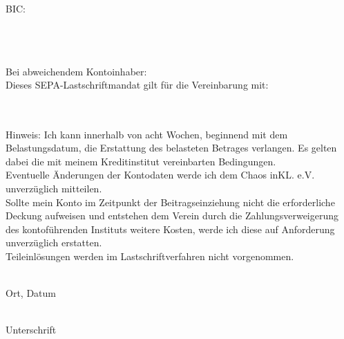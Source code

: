 \documentclass[ngerman,a4wide]{scrartcl}
\begin{document}
\begin{Form}
BIC:\\
\begin{tabular}{|p{}|}
\hline
\TextField[name=bic,width=.9\textwidth,%
bordercolor={0.65 0.79 0.94}]{}\\
\hline
\end{tabular}\\
\\
Bei abweichendem Kontoinhaber:\\
Dieses SEPA-Lastschriftmandat gilt für die Vereinbarung mit:\\
\begin{tabular}{|p{}|}
\hline
\TextField[name=altname,width=.9\textwidth,%
bordercolor={0.65 0.79 0.94}]{}\\
\hline
\end{tabular}\\

Hinweis: Ich kann innerhalb von acht Wochen, beginnend mit dem Belastungsdatum, die Erstattung des belasteten Betrages verlangen. Es gelten dabei die mit meinem Kreditinstitut vereinbarten Bedingungen.\\

Eventuelle Änderungen der Kontodaten werde ich dem Chaos inKL. e.V. unverzüglich mitteilen.\\

Sollte mein Konto im Zeitpunkt der Beitragseinziehung nicht die erforderliche Deckung aufweisen und entstehen dem Verein durch die Zahlungsverweigerung des kontoführenden Instituts weitere Kosten, werde ich diese auf Anforderung unverzüglich erstatten.\\

Teileinlösungen werden im Lastschriftverfahren nicht vorgenommen. \\

\vspace{3cm}
\begin{minipage}{7cm}
 \dotfill\\
 Ort, Datum
\end{minipage}
\hfill
\begin{minipage}{7cm}
 \dotfill\\
 Unterschrift
\end{minipage}






\vfill



\let\thefootnote\relax{}


\end{Form}
\end{document}

